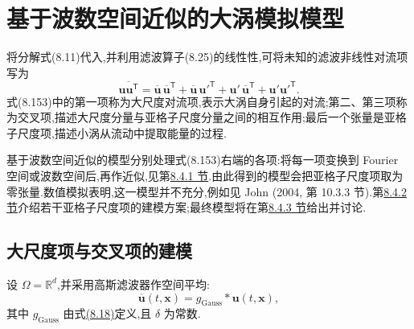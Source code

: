 \section{基于波数空间近似的大涡模拟模型}
\label{sec:les-wave-number-models}

\begin{note}[基本思路]
\label{note:les-model-basic-approach}
将分解式(8.11)代入,并利用滤波算子(8.25)的线性性,可将未知的滤波非线性对流项写为
\begin{equation}\label{eq:filtered-convection-scale-decomposition}
\overline{\bm{u}\bm{u}^{\mathsf T}}
=\overline{\bm{u}}\,\overline{\bm{u}}^{\mathsf T}
 +\overline{\bm{u}}\,\bm{u}'^{\mathsf T}
 +\bm{u}'\,\overline{\bm{u}}^{\mathsf T}
 +\bm{u}'\bm{u}'^{\mathsf T}.
\end{equation}
式(8.153)中的第一项称为大尺度对流项,表示大涡自身引起的对流;第二、第三项称为交叉项,描述大尺度分量与亚格子尺度分量之间的相互作用;最后一个张量是亚格子尺度项,描述小涡从流动中提取能量的过程.

基于波数空间近似的模型分别处理式(8.153)右端的各项:将每一项变换到 Fourier 空间或波数空间后,再作近似,见第\hyperref[subsec:les-large-cross-term-modeling]{8.4.1 节}.由此得到的模型会把亚格子尺度项取为零张量.数值模拟表明,这一模型并不充分,例如见 John (2004, 第 10.3.3 节).第\hyperref[subsec:les-subgrid-term-modeling]{8.4.2 节}介绍若干亚格子尺度项的建模方案;最终模型将在第\hyperref[subsec:les-wave-number-resulting-models]{8.4.3 节}给出并讨论.
\end{note}
\subsection{大尺度项与交叉项的建模}
\label{subsec:les-large-cross-term-modeling}

\begin{note}[假设]
\label{note:les-wave-number-assumptions}
设 $\Omega=\mathbb{R}^d$,并采用高斯滤波器作空间平均:
\[
 \overline{\bm{u}}(t,\bm{x})
 =g_{\mathrm{Gauss}}*\bm{u}(t,\bm{x}),
\]
其中 $g_{\mathrm{Gauss}}$ 由式\hyperref[eq:gaussian-filter-d-dimensional]{(8.18)}定义,且 $\delta$ 为常数.
\end{note}

